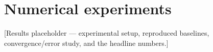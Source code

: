 \section{Numerical experiments}
\label{sec:experiments}
[Results placeholder — experimental setup, reproduced baselines, convergence/error study, and the headline numbers.]
